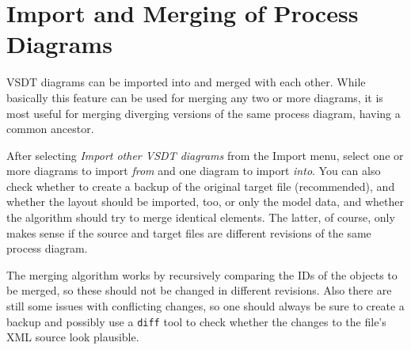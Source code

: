 \section{Import and Merging of Process Diagrams}
\label{sec:user_features_merging}

VSDT diagrams can be imported into and merged with each other.  While basically
this feature can be used for merging any two or more diagrams, it is most useful
for merging diverging versions of the same process diagram, having a common
ancestor.

After selecting \emph{Import other VSDT diagrams} from the Import menu, select
one or more diagrams to import \emph{from} and one diagram to import \emph{into}.
You can also check whether to create a backup of the original target file
(recommended), and whether the layout should be imported, too, or only the model
data, and whether the algorithm should try to merge identical elements.  The
latter, of course, only makes sense if the source and target files are different
revisions of the same process diagram.

The merging algorithm works by recursively comparing the IDs of the objects to be
merged, so these should not be changed in different revisions.  Also there are
still some issues with conflicting changes, so one should always be sure to create
a backup and possibly use a \texttt{diff} tool to check whether the changes to
the file's XML source look plausible.

